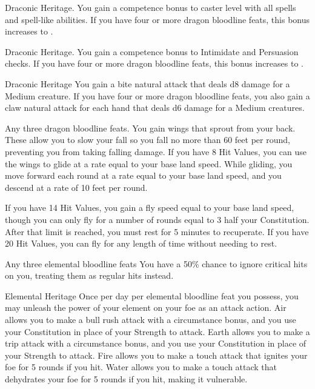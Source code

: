  Draconic Heritage.
 You gain a  competence bonus to caster level with all spells and spell-like abilities. If you have four or more dragon bloodline feats, this bonus increases to .

 Draconic Heritage.
 You gain a  competence bonus to Intimidate and Persuasion checks. If you have four or more dragon bloodline feats, this bonus increases to .

 Draconic Heritage
 You gain a bite natural attack that deals d8 damage for a Medium creature. If you have four or more dragon bloodline feats, you also gain a claw natural attack for each hand that deals d6 damage for a Medium creatures.

 Any three dragon bloodline feats.
 You gain wings that sprout from your back. These allow you to slow your fall so you fall no more than 60 feet per round, preventing you from taking falling damage. If you have 8 Hit Values, you can use the wings to glide at a rate equal to your base land speed. While gliding, you move forward each round at a rate equal to your base land speed, and you descend at a rate of 10 feet per round.

If you have 14 Hit Values, you gain a fly speed equal to your base land speed, though you can only fly for a number of rounds equal to 3 \add half your Constitution. After that limit is reached, you must rest for 5 minutes to recuperate. If you have 20 Hit Values, you can fly for any length of time without needing to rest.

\featpre Any three elemental bloodline feats
\featben You have a 50\% chance to ignore critical hits on you, treating them as regular hits instead.

\featpre Elemental Heritage
\featben Once per day per elemental bloodline feat you possess, you may unleash the power of your element on your foe as an attack action. Air allows you to make a bull rush attack with a  circumstance bonus, and you use your Constitution in place of your Strength to attack. Earth allows you to make a trip attack with a  circumstance bonus, and you use your Constitution in place of your Strength to attack. Fire allows you to make a touch attack that ignites your foe for 5 rounds if you hit. Water allows you to make a touch attack that dehydrates your foe for 5 rounds if you hit, making it vulnerable.

